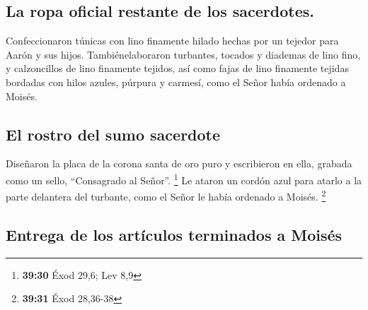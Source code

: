 \hypertarget{la-ropa-oficial-restante-de-los-sacerdotes.}{%
\subsection{La ropa oficial restante de los
sacerdotes.}\label{la-ropa-oficial-restante-de-los-sacerdotes.}}

 Confeccionaron túnicas con lino finamente hilado hechas
por un tejedor para Aarón y sus hijos.  Tambiénelaboraron
turbantes, tocados y diademas de lino fino, y calzoncillos de lino
finamente tejidos,  así como fajas de lino finamente
tejidas bordadas con hilos azules, púrpura y carmesí, como el Señor
había ordenado a Moisés.

\hypertarget{el-rostro-del-sumo-sacerdote}{%
\subsection{El rostro del sumo
sacerdote}\label{el-rostro-del-sumo-sacerdote}}

 Diseñaron la placa de la corona santa de oro puro y
escribieron en ella, grabada como un sello, ``Consagrado al Señor''.
\footnote{\textbf{39:30} Éxod 29,6; Lev 8,9}  Le ataron
un cordón azul para atarlo a la parte delantera del turbante, como el
Señor le había ordenado a Moisés. \footnote{\textbf{39:31} Éxod 28,36-38}

\hypertarget{entrega-de-los-artuxedculos-terminados-a-moisuxe9s}{%
\subsection{Entrega de los artículos terminados a
Moisés}\label{entrega-de-los-artuxedculos-terminados-a-moisuxe9s}}

